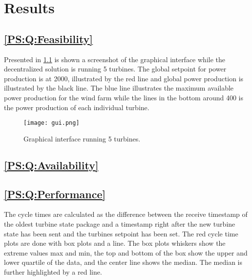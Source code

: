 
\newcommand{\resultsFigureWidthScale}{0.7}

\chapter{Results}

\section{\ref{PS:Q:Feasibility}}
Presented in \cref{fig:graphicalInterface} is shown a screenshot of the graphical interface while the decentralized solution is running 5 turbines.
The global setpoint for power production is at 2000, illustrated by the red line and global power production is illustrated by the black line.
The blue line illustrates the maximum available power production for the wind farm while the lines in the bottom around 400 is the power production of each individual turbine.

\begin{figure} [!h]
	\centering
	\texttt{[image: gui.png]} 
	\caption[Graphical interface running 5 turbines]{
		\label{fig:graphicalInterface} 
		\footnotesize{%
			Graphical interface running 5 turbines.
		}
	}
\end{figure}


\section{\ref{PS:Q:Availability}}

\section{\ref{PS:Q:Performance}}

The cycle times are calculated as the difference between the receive timestamp of the oldest turbine state package and a timestamp right after the new turbine state has been sent and the turbines setpoint has been set.
The red cycle time plots are done with box plots and a line. The box plots whiskers show the extreme values max and min, the top and bottom of the box show the upper and lower quartile of the data, and the center line shows the median. The median is further highlighted by a red line.

